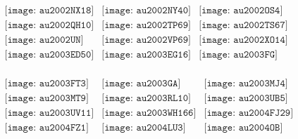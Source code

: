 \documentclass{article}
\begin{document}
\begin{figure}[H]
 \begin{center}$
 \begin{array}{cccc}
\texttt{[image: au2002NX18]}&\texttt{[image: au2002NY40]}&\texttt{[image: au2002OS4]}\\\texttt{[image: au2002QH10]}&\texttt{[image: au2002TP69]}&\texttt{[image: au2002TS67]}\\\texttt{[image: au2002UN]}&\texttt{[image: au2002VP69]}&\texttt{[image: au2002XO14]}\\\texttt{[image: au2003ED50]}&\texttt{[image: au2003EG16]}&\texttt{[image: au2003FG]}\\
\end{array}$
\end{center}
\end{figure}

\begin{figure}[H]
 \begin{center}$
 \begin{array}{cccc}
\texttt{[image: au2003FT3]}&\texttt{[image: au2003GA]}&\texttt{[image: au2003MJ4]}\\\texttt{[image: au2003MT9]}&\texttt{[image: au2003RL10]}&\texttt{[image: au2003UB5]}\\\texttt{[image: au2003UV11]}&\texttt{[image: au2003WH166]}&\texttt{[image: au2004FJ29]}\\\texttt{[image: au2004FZ1]}&\texttt{[image: au2004LU3]}&\texttt{[image: au2004OB]}\\
\end{array}$
\end{center}
\end{figure}
\end{document}
